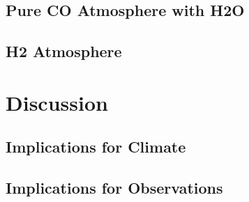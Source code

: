\subsection{Pure CO Atmosphere with H2O}

\subsection{H2 Atmosphere}


\section{Discussion}

\subsection{Implications for Climate}

\subsection{Implications for Observations}





% 
% 
